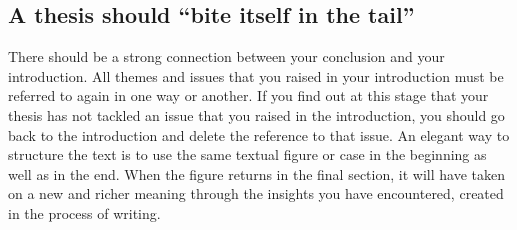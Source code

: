 \subsection{A thesis should ``bite itself in the tail''}
There should be a strong connection between your conclusion and your introduction. All themes and issues that you raised in your introduction must be referred to again in one way or another. If you find out at this stage that your thesis has not tackled an issue that you raised in the introduction, you should go back to the introduction and delete the reference to that issue. An elegant way to structure the text is to use the same textual figure or case in the beginning as well as in the end. When the figure returns in the final section, it will have taken on a new and richer meaning through the insights you have encountered, created in the process of writing.